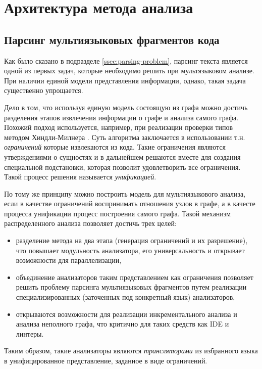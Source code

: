 \section{Архитектура метода анализа} \label{sec:architecture}

\subsection{Парсинг мультиязыковых фрагментов кода}

Как было сказано в подразделе \ref{ssec:parsing-problem}, парсинг текста является одной из первых
задач, которые необходимо решить при мультязыковом анализе. При наличии единой модели представления информации,
однако, такая задача существенно упрощается.

Дело в том, что используя единую модель состоящую из графа можно достичь разделения этапов
извлечения информации о графе и анализа самого графа. Похожий подход используется, например, при
реализации проверки типов методом Хиндли-Милнера \cite{algorithm-W}. Суть алгоритма заключается
в использовании т.н. \textit{ограничений} которые извлекаются из кода. Такие ограничения являются
утверждениями о сущностях и в дальнейшем решаются вместе для создания специальной подстановки, которая
позволит удовлетворить все ограничения. Такой процесс решения называется \textit{унификацией}.

По тому же принципу можно построить модель для мультиязыкового анализа, если в качестве ограничений
воспринимать отношения узлов в графе, а в качесте процесса унификации процесс построения самого графа. Такой
механизм распределенного анализа позволяет достичь трех целей:
\begin{itemize}
    \item разделение метода на два этапа (генерация ограничений и их разрешение), что повышает
    модульность анализатора, его универсальность и открывает возможности для параллелизации,
    \item объединение анализаторов таким представлением как ограничения позволяет решить проблему
    парсинга мультиязыковых фрагментов путем реализации специализированных (заточенных под конкретный
    язык) анализаторов,
    \item открываются возможности для реализации инкрементального анализа и анализа неполного графа, что
    критично для таких средств как IDE и линтеры.
\end{itemize}

Таким образом, такие анализаторы являются \textit{трансляторами} из избранного языка в унифицированное представление,
заданное в виде ограничений.

